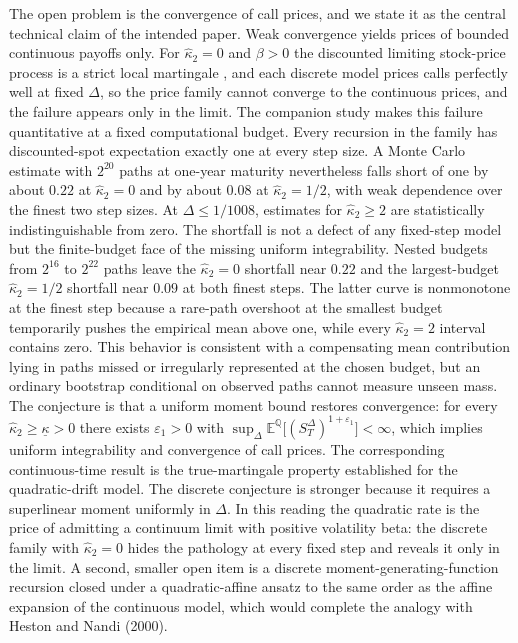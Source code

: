 \documentclass[11pt]{article}
\theoremstyle{remark}
\newcommand{\E}{\mathbb{E}}
\newcommand{\Qm}{\mathbb{Q}}
\newcommand{\Dt}{\Delta}
\begin{document}
The open problem is the convergence of call prices, and we state it as the
central technical claim of the intended paper.
Weak convergence yields prices of bounded continuous payoffs only.
For $\hat\kappa_2=0$ and $\beta>0$ the discounted limiting stock-price
process is a strict local martingale \cite{Sin1998,LionsMusiela2007}, and
each discrete model prices calls perfectly well at fixed $\Dt$, so the
price family cannot converge to the continuous prices, and the failure
appears only in the limit.
The companion study makes this failure quantitative at a fixed
computational budget.
Every recursion in the family has discounted-spot expectation exactly one
at every step size.
A Monte Carlo estimate with $2^{20}$ paths at one-year maturity
nevertheless falls short of one by about $0.22$ at $\hat\kappa_2=0$ and by
about $0.08$ at $\hat\kappa_2=1/2$, with weak dependence over the finest
two step sizes.
At $\Dt\le1/1008$, estimates for $\hat\kappa_2\ge2$ are statistically
indistinguishable from zero.
The shortfall is not a defect of any fixed-step model but the
finite-budget face of the missing uniform integrability.
Nested budgets from $2^{16}$ to $2^{22}$ paths leave the
$\hat\kappa_2=0$ shortfall near $0.22$ and the largest-budget
$\hat\kappa_2=1/2$ shortfall near $0.09$ at both finest steps.
The latter curve is nonmonotone at the finest step because a rare-path
overshoot at the smallest budget temporarily pushes the empirical mean
above one, while every $\hat\kappa_2=2$ interval contains zero.
This behavior is consistent with a compensating mean contribution lying
in paths missed or irregularly represented at the chosen budget, but an
ordinary bootstrap conditional on observed paths cannot measure unseen
mass.
The conjecture is that a uniform moment bound restores convergence: for
every $\hat\kappa_2\ge\underline{\kappa}>0$ there exists $\varepsilon_1>0$
with
$\sup_{\Dt}\E^{\Qm}\big[(S_T^{\Dt})^{1+\varepsilon_1}\big]<\infty$, which
implies uniform integrability and convergence of call prices.
The corresponding continuous-time result is the true-martingale property
established for the quadratic-drift model.
The discrete conjecture is stronger because it requires a superlinear
moment uniformly in $\Dt$.
In this reading the quadratic rate is the price of admitting a continuum
limit with positive volatility beta: the discrete family with
$\hat\kappa_2=0$ hides the pathology at every fixed step and reveals it
only in the limit.
A second, smaller open item is a discrete moment-generating-function
recursion closed under a quadratic-affine ansatz to the same order as the
affine expansion of the continuous model, which would complete the analogy
with Heston and Nandi (2000).
\end{document}
